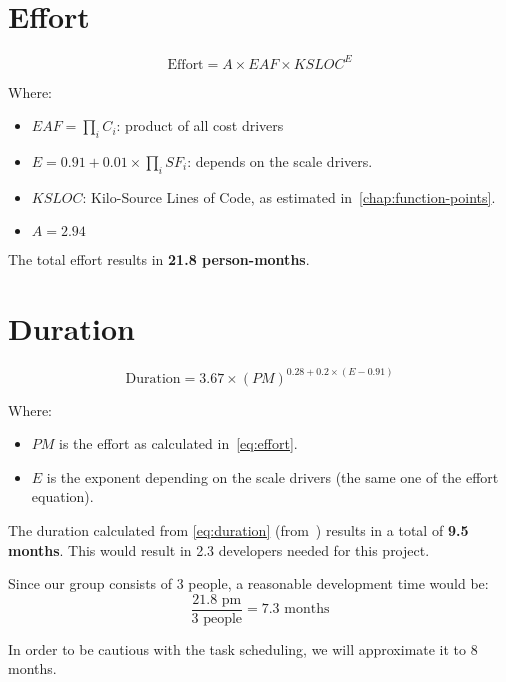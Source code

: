 \section{Effort}
\label{sec:effort}

\begin{equation}
    \textrm{Effort} = A \times EAF \times KSLOC^E
    \label{eq:effort}
\end{equation}

Where:
\begin{itemize}
    \item $EAF = \prod_i C_i$: product of all cost drivers
    \item $E=0.91 + 0.01 \times \prod_{i}SF_i$: depends on the scale drivers.
    \item $KSLOC$: Kilo-Source Lines of Code, as estimated in~\autoref{chap:function-points}.
    \item $A=2.94$
\end{itemize}

The total effort results in \textbf{21.8 person-months}.

\section{Duration}

\begin{equation}
    \textrm{Duration} = 3.67 \times (PM)^{0.28 + 0.2 \times (E-0.91)}
    \label{eq:duration}
\end{equation}

Where:
\begin{itemize}
    \item $PM$ is the effort as calculated in~\autoref{eq:effort}.
    \item $E$ is the exponent depending on the scale drivers (the same one of the effort equation).
\end{itemize}

The duration calculated from \autoref{eq:duration} (from~\cite{cocomo-manual}) results in a total of \textbf{9.5 months}.
This would result in 2.3 developers needed for this project.

Since our group consists of 3 people, a reasonable development time would be:
\[
    \frac{21.8\textrm{ pm}}{3 \textrm{ people}}=7.3\textrm{ months}
\]

In order to be cautious with the task scheduling, we will approximate it to 8 months.
